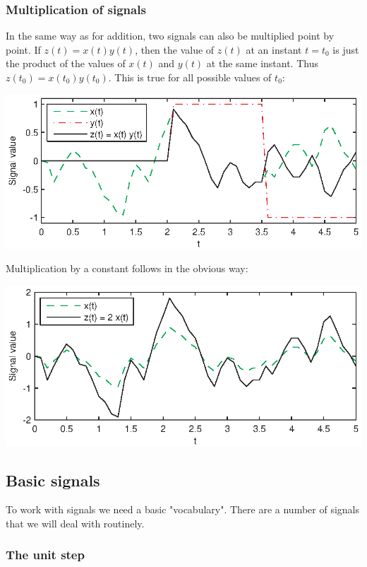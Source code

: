\documentclass[10pt]{beamer}
\begin{document}
\subsubsection{Multiplication of signals}
In the same way as for addition, two signals can also be multiplied point by point.  If $z(t) = x(t) y(t)$, then the value of $z(t)$ at an instant $t = t_0$ is just the product of the values of $x(t)$ and $y(t)$ at the same instant.  Thus $z(t_0) = x(t_0) y(t_0)$.  This is true for all possible values of $t_0$:
\begin{center}
  \includegraphics{multsignalsex1}
\end{center}
Multiplication by a constant follows in the obvious way:
\begin{center}
  \includegraphics{multsignalsex2}
\end{center}

\subsection{Basic signals}

To work with signals we need a basic "vocabulary".  There are a number of signals that we will deal with routinely.

\subsubsection{The unit step}
\end{document}
